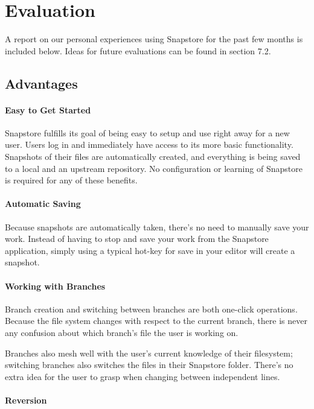\chapter{Evaluation}

A report on our personal experiences using Snapstore for the past few months is included below. Ideas for future evaluations can be found in section 7.2.

\section{Advantages}

\subsubsection{Easy to Get Started}

Snapstore fulfills its goal of being easy to setup and use right away for a new user. Users log in and immediately have access to its more basic functionality. Snapshots of their files are automatically created, and everything is being saved to a local and an upstream repository. No configuration or learning of Snapstore is required for any of these benefits. 

\subsubsection{Automatic Saving}

Because snapshots are automatically taken, there's no need to manually save your work. Instead of having to stop and save your work from the Snapstore application, simply using a typical hot-key for save in your editor will create a snapshot.

\subsubsection{Working with Branches}

Branch creation and switching between branches are both one-click operations. Because the file system changes with respect to the current branch, there is never any confusion about which branch's file the user is working on.

Branches also mesh well with the user's current knowledge of their filesystem; switching branches also switches the files in their Snapstore folder. There's no extra idea for the user to grasp when changing between independent lines. 

\subsubsection{Reversion}

